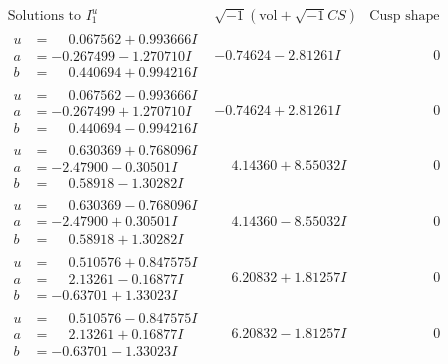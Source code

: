 \documentclass[1p]{elsarticle_modified}
\theoremstyle{definition}
\newcommand{\I}{\sqrt{-1}}
\begin{document}
$$\begin{array}{c|c|c}  
\text{Solutions to }I^u_{1}& \I (\text{vol} + \sqrt{-1}CS) & \text{Cusp shape}\\
 \hline 
\begin{aligned}
u &= \phantom{-}0.067562 + 0.993666 I \\
a &= -0.267499 - 1.270710 I \\
b &= \phantom{-}0.440694 + 0.994216 I\end{aligned}
 & -0.74624 - 2.81261 I & \phantom{-0.000000 } 0 \\ \hline\begin{aligned}
u &= \phantom{-}0.067562 - 0.993666 I \\
a &= -0.267499 + 1.270710 I \\
b &= \phantom{-}0.440694 - 0.994216 I\end{aligned}
 & -0.74624 + 2.81261 I & \phantom{-0.000000 } 0 \\ \hline\begin{aligned}
u &= \phantom{-}0.630369 + 0.768096 I \\
a &= -2.47900 - 0.30501 I \\
b &= \phantom{-}0.58918 - 1.30282 I\end{aligned}
 & \phantom{-}4.14360 + 8.55032 I & \phantom{-0.000000 } 0 \\ \hline\begin{aligned}
u &= \phantom{-}0.630369 - 0.768096 I \\
a &= -2.47900 + 0.30501 I \\
b &= \phantom{-}0.58918 + 1.30282 I\end{aligned}
 & \phantom{-}4.14360 - 8.55032 I & \phantom{-0.000000 } 0 \\ \hline\begin{aligned}
u &= \phantom{-}0.510576 + 0.847575 I \\
a &= \phantom{-}2.13261 - 0.16877 I \\
b &= -0.63701 + 1.33023 I\end{aligned}
 & \phantom{-}6.20832 + 1.81257 I & \phantom{-0.000000 } 0 \\ \hline\begin{aligned}
u &= \phantom{-}0.510576 - 0.847575 I \\
a &= \phantom{-}2.13261 + 0.16877 I \\
b &= -0.63701 - 1.33023 I\end{aligned}
 & \phantom{-}6.20832 - 1.81257 I & \phantom{-0.000000 } 0 \\ \hline\begin{aligned}

\end{aligned}
\end{array}$$
\end{document}
